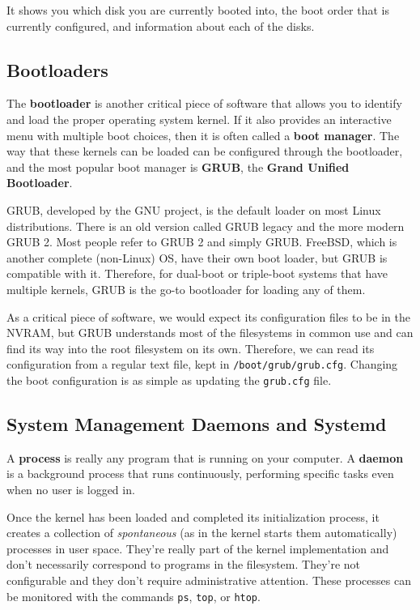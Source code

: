 \documentclass{article}
\theoremstyle{definition}
\begin{document}
  It shows you which disk you are currently booted into, the boot order that is currently configured, and information about each of the disks. 

  \subsection{Bootloaders}

    The \textbf{bootloader} is another critical piece of software that allows you to identify and load the proper operating system kernel. If it also provides an interactive menu with multiple boot choices, then it is often called a \textbf{boot manager}. The way that these kernels can be loaded can be configured through the bootloader, and the most popular boot manager is \textbf{GRUB}, the \textbf{Grand Unified Bootloader}. 

    GRUB, developed by the GNU project, is the default loader on most Linux distributions. There is an old version called GRUB legacy and the more modern GRUB 2. Most people refer to GRUB 2 and simply GRUB. FreeBSD, which is another complete (non-Linux) OS, have their own boot loader, but GRUB is compatible with it. Therefore, for dual-boot or triple-boot systems that have multiple kernels, GRUB is the go-to bootloader for loading any of them. 

    As a critical piece of software, we would expect its configuration files to be in the NVRAM, but GRUB understands most of the filesystems in common use and can find its way into the root filesystem on its own. Therefore, we can read its configuration from a regular text file, kept in \texttt{/boot/grub/grub.cfg}. Changing the boot configuration is as simple as updating the \texttt{grub.cfg} file. 


  \subsection{System Management Daemons and Systemd}

    A \textbf{process} is really any program that is running on your computer. A \textbf{daemon} is a background process that runs continuously, performing specific tasks even when no user is logged in. 

    Once the kernel has been loaded and completed its initialization process, it creates a collection of \textit{spontaneous} (as in the kernel starts them automatically) processes in user space. They're really part of the kernel implementation and don't necessarily correspond to programs in the filesystem. They're not configurable and they don't require administrative attention. These processes can be monitored with the commands \texttt{ps}, \texttt{top}, or \texttt{htop}.
\end{document}
